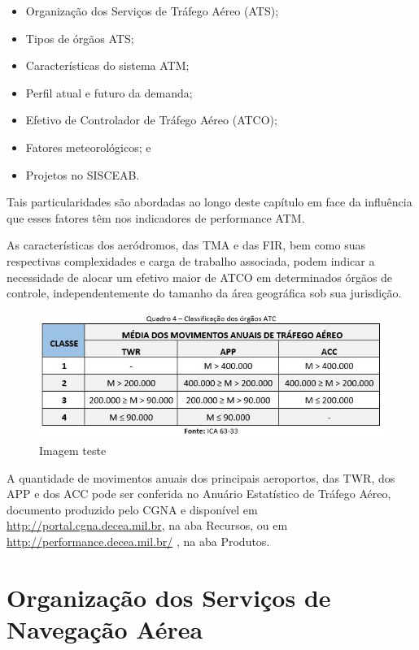 \documentclass[
]{book}
\providecommand{\tightlist}{%
  \setlength{\itemsep}{0pt}\setlength{\parskip}{0pt}}
\begin{document}
\begin{itemize}
\tightlist
\item
  Organização dos Serviços de Tráfego Aéreo (ATS);
\item
  Tipos de órgãos ATS;
\item
  Características do sistema ATM;
\item
  Perfil atual e futuro da demanda;
\item
  Efetivo de Controlador de Tráfego Aéreo (ATCO);
\item
  Fatores meteorológicos; e
\item
  Projetos no SISCEAB.
\end{itemize}

Tais particularidades são abordadas ao longo deste capítulo em face da influência que esses fatores têm nos indicadores de performance ATM.

As características dos aeródromos, das TMA e das FIR, bem como suas respectivas complexidades e carga de trabalho associada, podem indicar a necessidade de alocar um efetivo maior de ATCO em determinados órgãos de controle, independentemente do tamanho da área geográfica sob sua jurisdição.

\begin{figure}
\centering
\includegraphics{imagens/fig10.jpg}
\caption{Imagem teste}
\end{figure}

A quantidade de movimentos anuais dos principais aeroportos, das TWR, dos APP e dos ACC pode ser conferida no Anuário Estatístico de Tráfego Aéreo, documento produzido pelo CGNA e disponível em \url{http://portal.cgna.decea.mil.br}, na aba Recursos, ou em \url{http://performance.decea.mil.br/} , na aba Produtos.

\hypertarget{organizauxe7uxe3o-dos-serviuxe7os-de-navegauxe7uxe3o-auxe9rea}{%
\section{Organização dos Serviços de Navegação Aérea}\label{organizauxe7uxe3o-dos-serviuxe7os-de-navegauxe7uxe3o-auxe9rea}}
\end{document}
